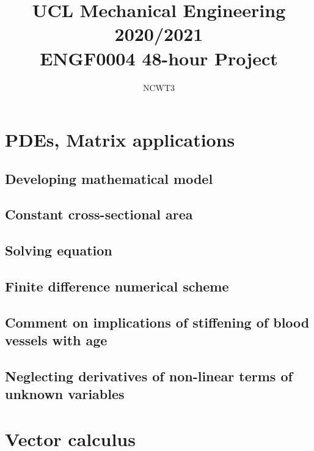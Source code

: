\documentclass[11pt]{article}
\numberwithin{equation}{section}
\begin{document}
\title{\textbf{UCL Mechanical Engineering 2020/2021}\\ENGF0004 48-hour Project}
\author{NCWT3}
\maketitle
\tableofcontents
\listoffigures
\section{PDEs, Matrix applications}
\subsection{Developing mathematical model}
\subsection{Constant cross-sectional area}
\subsection{Solving equation}
\subsection{Finite difference numerical scheme}
\subsection{Comment on implications of stiffening of blood vessels with age}
\subsection{Neglecting derivatives of non-linear terms of unknown variables}
\section{Vector calculus}
\end{document}
